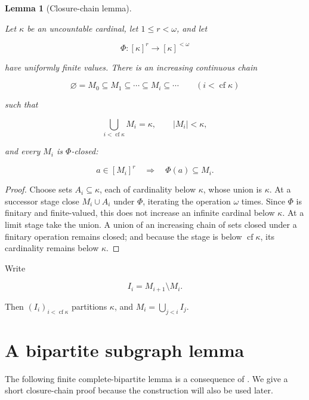 \documentclass[a4paper,11pt,reqno]{amsart}
\theoremstyle{plain}
\newtheorem{lemma}[theorem]{Lemma}
\theoremstyle{definition}
\theoremstyle{remark}
\begin{document}
\begin{lemma}[Closure-chain lemma]\label{lemma-1.4-closure-chain-lemma}

Let \(\kappa\) be an uncountable cardinal, let \(1\le r<\omega\), and let

\[
\Phi:[\kappa]^r\longrightarrow[\kappa]^{<\omega}
\]

have uniformly finite values. There is an increasing continuous chain

\[
\varnothing=M_0\subseteq M_1\subseteq\cdots
\subseteq M_i\subseteq\cdots\qquad(i<\operatorname{cf}\kappa)
\]

such that

\[
\bigcup_{i<\operatorname{cf}\kappa}M_i=\kappa,
\qquad |M_i|<\kappa,
\]

and every \(M_i\) is \(\Phi\)-closed:

\[
a\in[M_i]^r\quad\Longrightarrow\quad\Phi(a)\subseteq M_i.
\]

\end{lemma}
\begin{proof}
Choose sets \(A_i\subseteq\kappa\), each of cardinality below \(\kappa\), whose union is \(\kappa\). At a successor stage close \(M_i\cup A_i\) under \(\Phi\), iterating the operation \(\omega\) times. Since \(\Phi\) is finitary and finite-valued, this does not increase an infinite cardinal below \(\kappa\). At a limit stage take the union. A union of an increasing chain of sets closed under a finitary operation remains closed; and because the stage is below \(\operatorname{cf}\kappa\), its cardinality remains below \(\kappa\).
\end{proof}

Write

\[
I_i=M_{i+1}\setminus M_i.
\]

Then \((I_i)_{i<\operatorname{cf}\kappa}\) partitions \(\kappa\), and \(M_i=\bigcup_{j<i}I_j\).

\section{A bipartite subgraph lemma}\label{the-graph-lemma-needed-for-the-expansion-atom}

The following finite complete-bipartite lemma is a consequence of
\citet[Corollary~5.6, p.~72]{erdoshajnal1966}.  We give a short
closure-chain proof because the construction will also be used later.
\end{document}
